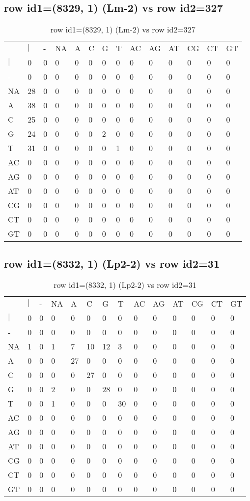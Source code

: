 \subsection{row id1=(8329, 1) (Lm-2) vs row id2=327}
\begin{center}
\begin{longtable}{|l|l|l|l|l|l|l|l|l|l|l|l|l|l|}
\caption{row id1=(8329, 1) (Lm-2) vs row id2=327} \label{table_dm528}\\
\hline
\\
\hline
&$|$&-&NA&A&C&G&T&AC&AG&AT&CG&CT&GT\\
$|$&0&0&0&0&0&0&0&0&0&0&0&0&0\\
-&0&0&0&0&0&0&0&0&0&0&0&0&0\\
NA&28&0&0&0&0&0&0&0&0&0&0&0&0\\
A&38&0&0&0&0&0&0&0&0&0&0&0&0\\
C&25&0&0&0&0&0&0&0&0&0&0&0&0\\
G&24&0&0&0&0&2&0&0&0&0&0&0&0\\
T&31&0&0&0&0&0&1&0&0&0&0&0&0\\
AC&0&0&0&0&0&0&0&0&0&0&0&0&0\\
AG&0&0&0&0&0&0&0&0&0&0&0&0&0\\
AT&0&0&0&0&0&0&0&0&0&0&0&0&0\\
CG&0&0&0&0&0&0&0&0&0&0&0&0&0\\
CT&0&0&0&0&0&0&0&0&0&0&0&0&0\\
GT&0&0&0&0&0&0&0&0&0&0&0&0&0\\
\hline
\end{longtable}
\end{center}

\subsection{row id1=(8332, 1) (Lp2-2) vs row id2=31}
\begin{center}
\begin{longtable}{|l|l|l|l|l|l|l|l|l|l|l|l|l|l|}
\caption{row id1=(8332, 1) (Lp2-2) vs row id2=31} \label{table_dm530}\\
\hline
\\
\hline
&$|$&-&NA&A&C&G&T&AC&AG&AT&CG&CT&GT\\
$|$&0&0&0&0&0&0&0&0&0&0&0&0&0\\
-&0&0&0&0&0&0&0&0&0&0&0&0&0\\
NA&1&0&1&7&10&12&3&0&0&0&0&0&0\\
A&0&0&0&27&0&0&0&0&0&0&0&0&0\\
C&0&0&0&0&27&0&0&0&0&0&0&0&0\\
G&0&0&2&0&0&28&0&0&0&0&0&0&0\\
T&0&0&1&0&0&0&30&0&0&0&0&0&0\\
AC&0&0&0&0&0&0&0&0&0&0&0&0&0\\
AG&0&0&0&0&0&0&0&0&0&0&0&0&0\\
AT&0&0&0&0&0&0&0&0&0&0&0&0&0\\
CG&0&0&0&0&0&0&0&0&0&0&0&0&0\\
CT&0&0&0&0&0&0&0&0&0&0&0&0&0\\
GT&0&0&0&0&0&0&0&0&0&0&0&0&0\\
\hline
\end{longtable}
\end{center}

